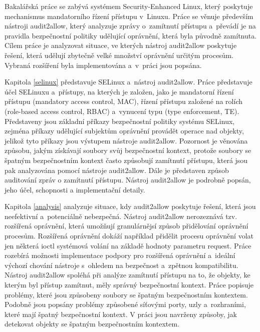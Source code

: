 Bakalářská práce se zabývá systémem Security-Enhanced Linux, který poskytuje
me\-cha\-nismus mandatorního řízení přístupu v~Linuxu. Práce se věnuje především
nástroji \mbox{audit2allow}, který analyzuje zprávy o~zamítnutí přístupu
a~převádí je na pravidla bezpečnostní politiky udělující oprávnění, která byla
původně zamítnuta. Cílem práce je analyzovat situace, ve kterých nástroj
audit2allow poskytuje řešení, která udělují zbytečně velké množství oprávnění
určitým procesům. Vybraná rozšíření byla implementována a~v~práci jsou popsána.

Kapitola \ref{selinux} představuje SELinux a~nástroj audit2allow. Práce
představuje účel SELinuxu a~přístupy, na kterých je založen, jako je mandatorní
řízení přístupu (mandatory access control, MAC), řízení přístupu založené na
rolích (role-based access control, RBAC) a~vynucení typu (type enforcement, TE).
Představeny jsou základní příkazy bezpečnostní politiky systému SELinux, zejména
příkazy udělující subjektům oprávnění provádět operace nad objekty, jelikož tyto
příkazy jsou výstupem nástroje audit2allow. Pozornost je věnována způsobu, jakým
získávají soubory svůj bezpečnostní kontext, protože soubory se špatným
bezpečnostním kontext často způsobují zamítnutí přístupu, která jsou pak
analyzována pomocí nástroje audit2allow. Dále je představen způsob auditování
zpráv o zamítnutí přístupu. Nástroj audit2allow je podrobně popsán, jeho účel,
schopnosti a implementační detaily.

Kapitola \ref{analysis} analyzuje situace, kdy audit2allow poskytuje řešení,
která jsou neefektivní a~potenciálně nebezpečná. Nástroj audit2allow nerozeznává
tzv. rozšířená oprávnění, která umožňují granulárnějsí způsob přidělování
oprávnění procesům. Rozšířená oprávnění dokáží například přidělit procesu
oprávnění volat jen některá ioctl systémová volání na základě hodnoty parametru
request. Práce rozebírá možnosti implementace podpory pro rozšířená oprávnění
a~ideální výchozí chování nástroje s~ohledem na bezpečnost a~zpětnou
kompatibilitu.
Nástroj audit2allow spoléhá při analýze zamítnutí přístupu na to, že
objekty, ke kterým byl přístup zamítnut, měly správný bezpečnostní kontext.
Práce popisuje problémy, které jsou způsobeny soubory se špatným bezpečnostním
kontextem. Podobně jsou popsány problémy způsobené síťovými porty, uzly
a~rozhraními, které mají špatný bezpečnostní kontext. V práci jsou navrženy
způsoby, jak detekovat objekty se špatným bezpečnostním kontextem.

